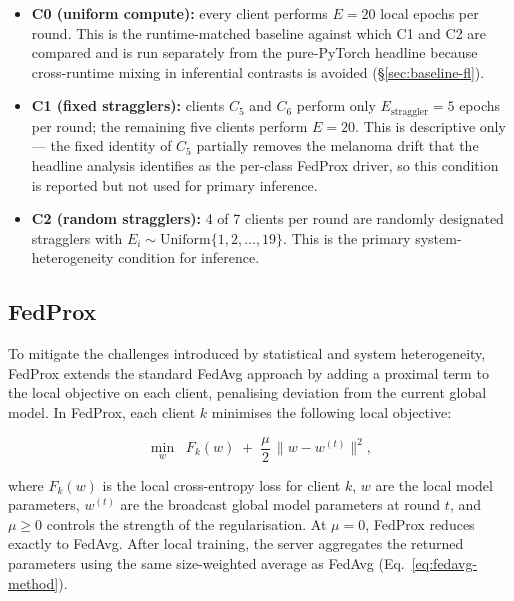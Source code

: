 \documentclass[11pt,a4paper]{report}  %
\begin{document}
\begin{itemize}
\item \textbf{C0 (uniform compute):} every client performs $E = 20$
local epochs per round. This is the runtime-matched baseline against
which C1 and C2 are compared and is run separately from the
pure-PyTorch headline because cross-runtime mixing in inferential
contrasts is avoided (§\ref{sec:baseline-fl}).
\item \textbf{C1 (fixed stragglers):} clients $C_5$ and $C_6$ perform
only $E_{\text{straggler}} = 5$ epochs per round; the remaining five
clients perform $E = 20$. This is descriptive only — the fixed
identity of $C_5$ partially removes the melanoma drift that the
headline analysis identifies as the per-class FedProx driver, so this
condition is reported but not used for primary inference.
\item \textbf{C2 (random stragglers):} 4 of 7 clients per round are
randomly designated stragglers with
$E_i \sim \mathrm{Uniform}\{1, 2, \ldots, 19\}$. This is the
primary system-heterogeneity condition for inference.
\end{itemize}

\subsection{FedProx}
\label{sec:fedprox}


To mitigate the challenges introduced by statistical and system
heterogeneity, FedProx \citep{li2020fedprox} extends the standard
FedAvg approach by adding a proximal term to the local objective on
each client, penalising deviation from the current global model.
In FedProx, each client $k$ minimises the following local objective:

\begin{equation}
\min_w \;\; F_k(w) \;+\; \frac{\mu}{2}\,\bigl\lVert w - w^{(t)} \bigr\rVert^2,
\label{eq:fedprox-method}
\end{equation}

where $F_k(w)$ is the local cross-entropy loss for client $k$, $w$ are
the local model parameters, $w^{(t)}$ are the broadcast global model
parameters at round $t$, and $\mu \geq 0$ controls the strength of the
regularisation. At $\mu = 0$, FedProx reduces exactly to FedAvg. After
local training, the server aggregates the returned parameters using
the same size-weighted average as FedAvg (Eq.~\ref{eq:fedavg-method}).
\end{document}
